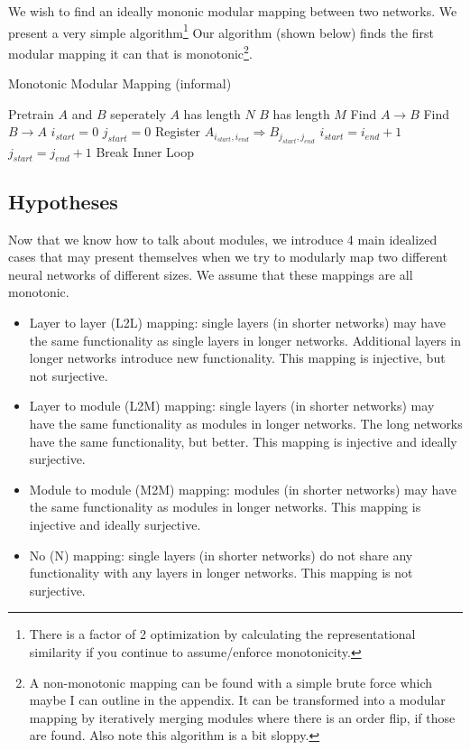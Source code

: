 \documentclass{article} %
\begin{document}
We wish to find an ideally mononic modular mapping between two networks. We present a very simple algorithm\footnote{There is a factor of 2 optimization by calculating the representational similarity if you continue to assume/enforce monotonicity.}
Our algorithm (shown below) finds the first modular mapping it can that is monotonic\footnote{A non-monotonic mapping can be found with a simple brute force which maybe I can outline in the appendix. It can be transformed into a modular mapping by iteratively merging modules where there is an order flip, if those are found. Also note this algorithm is a bit sloppy.}.
\begin{algorithm}
\caption{Monotonic Modular Mapping (informal)}
\begin{algorithmic}[h]
      \State Pretrain \(A\) and \(B\) seperately
      \State \(A\) has length \(N\)
      \State \(B\) has length \(M\)
      \State Find \(A\rightarrow B\)
      \State Find \(B\rightarrow A\)
      \State \(i_{start} = 0\)
      \State \(j_{start} = 0\)
               \State Register \(A_{i_{start}, i_{end}} \Rightarrow B_{j_{start}, j_{end}}\)
               \State \(i_{start} = i_{end} + 1\)
               \State \(j_{start} = j_{end} + 1\)
               \State Break Inner Loop
            \EndIf
         \EndFor
      \EndFor
\EndProcedure
\end{algorithmic}
\end{algorithm}

\subsection{Hypotheses}
Now that we know how to talk about modules, we introduce 4 main idealized cases that may present themselves when we
try to modularly map two different neural networks of different sizes. We assume that these mappings are all monotonic.
\begin{itemize}
   \item Layer to layer (L2L) mapping: single layers (in shorter networks) may have the same functionality as single layers in longer networks. Additional layers in longer networks introduce new functionality. This mapping is injective, but not surjective.
   \item Layer to module (L2M) mapping: single layers (in shorter networks) may have the same functionality as modules in longer networks. The long networks have the same functionality, but better. This mapping is injective and ideally surjective.
   \item Module to module (M2M) mapping: modules (in shorter networks) may have the same functionality as modules in longer networks. This mapping is injective and ideally surjective.
   \item No (N) mapping: single layers (in shorter networks) do not share any functionality with any layers in longer networks. This mapping is not surjective.
\end{itemize}
\end{document}
